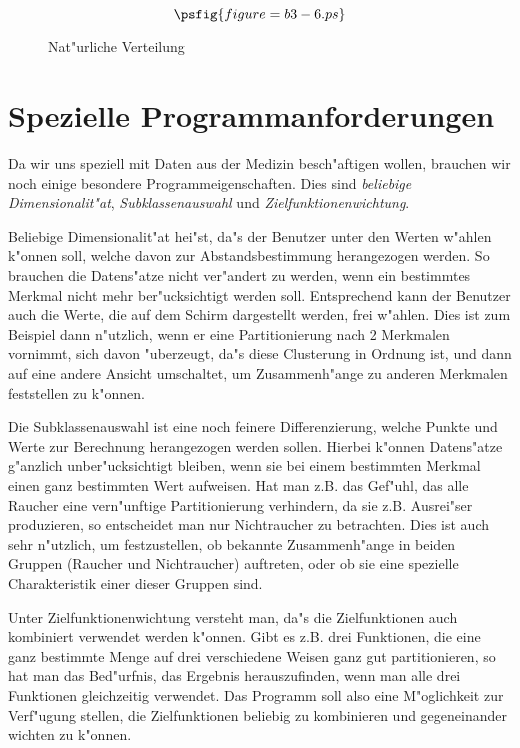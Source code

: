 \begin{figure}[htp]
\[
\psfig{figure=b3-6.ps}
\]
\caption{Nat"urliche Verteilung}
\end{figure}



\section{Spezielle Programmanforderungen}
Da wir uns speziell mit Daten aus der Medizin besch"aftigen wollen,
brauchen wir noch einige besondere Programmeigenschaften. Dies sind
{\em beliebige Dimensionalit"at}, {\em Subklassenauswahl} und {\em
Zielfunktionenwichtung}.

Beliebige Dimensionalit"at hei"st, da"s der Benutzer unter den Werten
w"ahlen k"onnen soll, welche davon zur Abstandsbestimmung
herangezogen werden. So brauchen die Datens"atze nicht
ver"andert zu werden, wenn ein bestimmtes Merkmal nicht mehr ber"ucksichtigt
werden soll. Entsprechend kann der Benutzer auch die Werte, die auf dem 
Schirm dargestellt werden, frei w"ahlen. Dies ist zum Beispiel dann
n"utzlich, wenn er eine Partitionierung nach 2 Merkmalen vornimmt, sich
davon "uberzeugt, da"s diese Clusterung in Ordnung ist, und dann
auf eine andere Ansicht umschaltet, um Zusammenh"ange zu anderen 
Merkmalen feststellen zu k"onnen.

Die Subklassenauswahl ist eine noch feinere Differenzierung, welche
Punkte und Werte zur Berechnung herangezogen werden sollen.
Hierbei k"onnen Datens"atze g"anzlich unber"ucksichtigt bleiben, wenn
sie bei einem bestimmten Merkmal einen ganz bestimmten Wert aufweisen.
Hat man z.B. das Gef"uhl, das alle Raucher eine vern"unftige
Partitionierung verhindern, da sie z.B.	Ausrei"ser produzieren, so
entscheidet man nur Nichtraucher zu betrachten. 
Dies ist auch sehr n"utzlich, um festzustellen, ob bekannte
Zusammenh"ange in beiden Gruppen (Raucher und Nichtraucher) auftreten,
oder ob sie eine spezielle Charakteristik einer dieser Gruppen sind.

Unter Zielfunktionenwichtung versteht man, da"s die Zielfunktionen auch
kombiniert verwendet werden k"onnen. Gibt es z.B. drei Funktionen, 
die eine ganz bestimmte Menge auf drei verschiedene Weisen ganz gut
partitionieren, so hat man das Bed"urfnis, das Ergebnis herauszufinden, 
wenn man alle drei Funktionen gleichzeitig verwendet.
Das Programm soll also eine M"oglichkeit zur Verf"ugung stellen, die
Zielfunktionen beliebig zu kombinieren und gegeneinander wichten 
zu k"onnen.

